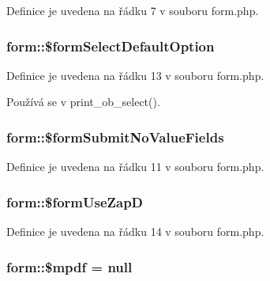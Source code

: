Definice je uvedena na řádku 7 v souboru form.\-php.

\hypertarget{classform_a5ed3797ff7e798d32836a58890459aee}{
\subsubsection[{\$form\-Select\-Default\-Option}]{\setlength{\rightskip}{0pt plus 5cm}form\-::\$form\-Select\-Default\-Option}}\label{classform_a5ed3797ff7e798d32836a58890459aee}


Definice je uvedena na řádku 13 v souboru form.\-php.



Používá se v print\-\_\-ob\-\_\-select().

\hypertarget{classform_afb8feff6b45d0e269299adb187236c25}{
\subsubsection[{\$form\-Submit\-No\-Value\-Fields}]{\setlength{\rightskip}{0pt plus 5cm}form\-::\$form\-Submit\-No\-Value\-Fields}}\label{classform_afb8feff6b45d0e269299adb187236c25}


Definice je uvedena na řádku 11 v souboru form.\-php.

\hypertarget{classform_aa769f3bffa78452b1a47b554e00f5d60}{
\subsubsection[{\$form\-Use\-Zap\-D}]{\setlength{\rightskip}{0pt plus 5cm}form\-::\$form\-Use\-Zap\-D}}\label{classform_aa769f3bffa78452b1a47b554e00f5d60}


Definice je uvedena na řádku 14 v souboru form.\-php.

\hypertarget{classform_a2a3e1e7b89808cdbd2692e3218468927}{
\subsubsection[{\$mpdf}]{\setlength{\rightskip}{0pt plus 5cm}form\-::\$mpdf = null}}\label{classform_a2a3e1e7b89808cdbd2692e3218468927}


